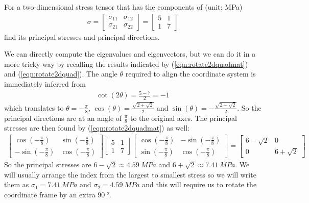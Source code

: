 \begin{exmp}
For a two-dimensional stress tensor that has the components of (unit: \si{MPa})
\begin{align*}
\sigma =
\begin{bmatrix}
\sigma_{11} & \sigma_{12} \\
\sigma_{21} & \sigma_{22}
\end{bmatrix}
=
\begin{bmatrix}
5 & 1 \\
1 & 7
\end{bmatrix}
\end{align*}
find its principal stresses and principal directions.
\end{exmp}
\begin{solution}
We can directly compute the eigenvalues and eigenvectors, but we can do it in a more tricky way by recalling the results indicated by (\ref{eqn:rotate2dquadmat}) and (\ref{eqn:rotate2dquad}). The angle $\theta$ required to align the coordinate system is immediately inferred from 
\begin{align*}
\cot(2\theta) = \frac{5-7}{2} = -1
\end{align*}
which translates to $\theta = -\frac{\pi}{8}$, $\cos(\theta) = \frac{\sqrt{2+\sqrt{2}}}{2}$ and $\sin(\theta) = -\frac{\sqrt{2-\sqrt{2}}}{2}$. So the principal directions are at an angle of $\frac{\pi}{8}$ to the original axes. The principal stresses are then found by (\ref{eqn:rotate2dquadmat}) as well:
\begin{align*}
\begin{bmatrix}
\cos (-\frac{\pi}{8}) & \sin (-\frac{\pi}{8}) \\
-\sin (-\frac{\pi}{8}) & \cos (-\frac{\pi}{8})
\end{bmatrix}
\begin{bmatrix}
5 & 1 \\
1 & 7
\end{bmatrix}
\begin{bmatrix}
\cos (-\frac{\pi}{8}) & -\sin (-\frac{\pi}{8}) \\
\sin (-\frac{\pi}{8}) & \cos (-\frac{\pi}{8})
\end{bmatrix}
=    
\begin{bmatrix}
6-\sqrt{2} & 0 \\
0 & 6+\sqrt{2}
\end{bmatrix}
\end{align*}
So the principal stresses are $6-\sqrt{2} \approx \SI{4.59}{MPa}$ and $6+\sqrt{2} \approx \SI{7.41}{MPa}$. We will usually arrange the index from the largest to smallest stress so we will write them as $\sigma_1 = \SI{7.41}{MPa}$ and $\sigma_2 = \SI{4.59}{MPa}$ and this will require us to rotate the coordinate frame by an extra $\SI{90}{\degree}$.
\end{solution}
